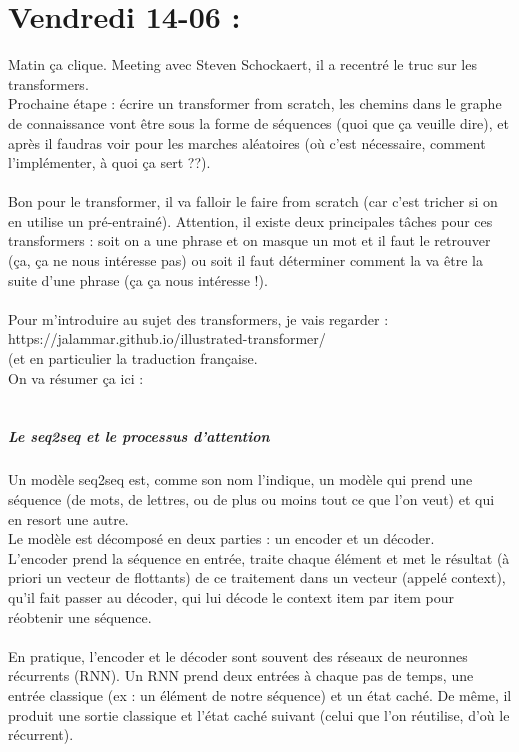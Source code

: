 \documentclass{article}
\begin{document}
\section*{Vendredi 14-06 :} 
Matin ça clique. Meeting avec Steven Schockaert, il a recentré le truc sur les transformers.\\
Prochaine étape : écrire un transformer from scratch, les chemins dans le graphe de connaissance vont être sous la forme de séquences (quoi que ça veuille dire), et après il faudras voir pour les marches aléatoires (où c'est nécessaire, comment l'implémenter, à quoi ça sert ??).\\
\\
Bon pour le transformer, il va falloir le faire from scratch (car c'est tricher si on en utilise un pré-entrainé). Attention, il existe deux principales tâches pour ces transformers : soit on a une phrase et on masque un mot et il faut le retrouver (ça, ça ne nous intéresse pas) ou soit il faut déterminer comment la va être la suite d'une phrase (ça ça nous intéresse !).\\
\\
Pour m'introduire au sujet des transformers, je vais regarder : \\
https://jalammar.github.io/illustrated-transformer/\\
(et en particulier la traduction française.\\
On va résumer ça ici :\\
\\
\subparagraph*{Le seq2seq et le processus d'attention}
Un modèle seq2seq est, comme son nom l'indique, un modèle qui prend une séquence (de mots, de lettres, ou de plus ou moins tout ce que l'on veut) et qui en resort une autre.\\
Le modèle est décomposé en deux parties : un encoder et un décoder.\\
L'encoder prend la séquence en entrée, traite chaque élément et met le résultat (à priori un vecteur de flottants) de ce traitement dans un vecteur (appelé context), qu'il fait passer au décoder, qui lui décode le context item par item pour réobtenir une séquence.\\
\\
En pratique, l'encoder et le décoder sont souvent des réseaux de neuronnes récurrents (RNN).
Un RNN prend deux entrées à chaque pas de temps, une entrée classique (ex : un élément de notre séquence) et un état caché. De même, il produit une sortie classique et l'état caché suivant (celui que l'on réutilise, d'où le récurrent).\\
\end{document}
